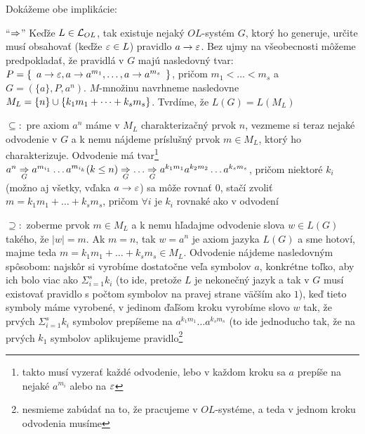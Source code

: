\begin{dokaz}
  Dokážeme obe implikácie:
  \begin{description}
    \item{``$\Rightarrow$''} Keďže $L\in\mathcal{L}_{OL}$, tak existuje nejaký
      $OL$-systém $G$, ktorý ho generuje, určite musí obsahovať (keďže
      $\varepsilon\in L$) pravidlo $a\rightarrow\varepsilon$. Bez ujmy na
      všeobecnosti môžeme predpokladať, že pravidlá v $G$ majú
      nasledovný tvar: $P=\{\enspace a\rightarrow\varepsilon,a\rightarrow
      a^{m_{1}},\dots,a\rightarrow a^{m_{s}}\enspace\}$, pričom $m_{1}<\dots<m_{s}$
      a $G=(\{a\},P,a^{n})$. $M$-množinu navrhneme nasledovne
      $M_{L}=\{n\}\cup\{k_{1}m_{1}+\dots+k_{s}m_{s}\}$. Tvrdíme, že
      $L(G)=L(M_{L})$
      \begin{description}
        \item{$\subseteq:$} pre axiom $a^{n}$ máme v $M_{L}$
          charakterizačný prvok $n$, vezmeme si teraz nejaké odvodenie v $G$
          a k nemu nájdeme príslušný prvok $m\in M_{L}$, ktorý ho
          charakterizuje. Odvodenie má tvar\footnote{takto musí vyzerať
          každé odvodenie, lebo v každom kroku sa $a$ prepíše na nejaké
          $a^{m_{i}}$ alebo na $\varepsilon$} $a^{n}\underset{G}{\Rightarrow}
          a^{m_{i_{1}}}\dots a^{m_{i_{k}}}(k\leq
          n)\underset{G}{\Rightarrow}\dots\underset{G}{\Rightarrow}
          a^{k_{1}m_{1}}a^{k_{2}m_{2}}\dots a^{k_{s}m_{s}}$, pričom niektoré
          $k_{i}$ (možno aj všetky, vďaka $a\rightarrow\varepsilon$) sa môže rovnať
          $0$, stačí zvoliť $m=k_{1}m_{1}+\dots+k_{s}m_{s}$, pričom $\forall
          i$ je $k_{i}$ rovnaké ako v odvodení
        \item{$\supseteq:$} zoberme prvok $m\in M_{L}$ a k nemu hľadajme
          odvodenie slova $w\in L(G)$ takého, že $|w|=m$. Ak $m=n$, tak
          $w=a^{n}$ je axiom jazyka $L(G)$ a sme hotoví, majme teda
          $m=k_{1}m_{1}+\dots+k_{s}m_{s}\in M_{L}$. Odvodenie nájdeme
          nasledovným spôsobom: najskôr si vyrobíme dostatočne veľa symbolov
          $a$, konkrétne  toľko, aby ich bolo viac ako
          $\Sigma_{i=1}^{s}k_{i}$ (to ide, pretože $L$ je nekonečný jazyk a
          tak v $G$ musí existovať pravidlo s počtom symbolov na pravej
          strane väčším ako $1$), keď tieto symboly máme vyrobené, v jedinom
          ďaľšom kroku vyrobíme slovo $w$ tak, že prvých
          $\Sigma_{i=1}^{s}k_{i}$ symbolov prepíšeme na $a^{k_{1}m_{1}}\dots
          a^{k_{s}m_{s}}$ (to ide jednoducho tak, že na prvých $k_{1}$
          symbolov aplikujeme pravidlo\footnote{nesmieme zabúdať na to, že
          pracujeme v $OL$-systéme, a teda v jednom kroku odvodenia musíme
}
\end{description}
\end{description}
\end{dokaz}
